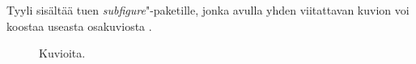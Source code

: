 \noindent Tyyli sisältää tuen \emph{subfigure}"-paketille, jonka avulla yhden viitattavan kuvion  voi koostaa useasta osakuviosta .

\begin{figure}[h]
\hspace{0.75cm}
\caption{Kuvioita.}
\label{fig:Kuvioita}
\end{figure}
